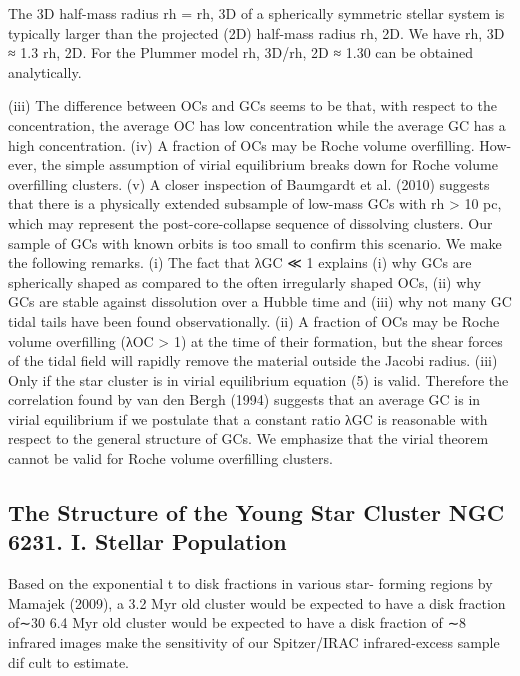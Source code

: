 \documentclass[../main.tex]{subfiles}
\begin{document}
The 3D half-mass radius rh = rh, 3D of a spherically symmetric
stellar system is typically larger than the projected (2D) half-mass
radius rh, 2D. We have rh, 3D ≈ 1.3 rh, 2D. For the Plummer model
rh, 3D/rh, 2D ≈ 1.30 can be obtained analytically.

(iii) The difference between OCs and GCs seems to be that, with
respect to the concentration, the average OC has low concentration
while the average GC has a high concentration.
(iv) A fraction of OCs may be Roche volume overfilling. How-
ever, the simple assumption of virial equilibrium breaks down for
Roche volume overfilling clusters.
(v) A closer inspection of Baumgardt et al. (2010) suggests that
there is a physically extended subsample of low-mass GCs with
rh > 10 pc, which may represent the post-core-collapse sequence
of dissolving clusters. Our sample of GCs with known orbits is too
small to confirm this scenario.
We make the following remarks.
(i) The fact that λGC ≪ 1 explains (i) why GCs are spherically
shaped as compared to the often irregularly shaped OCs, (ii) why
GCs are stable against dissolution over a Hubble time and (iii) why
not many GC tidal tails have been found observationally.
(ii) A fraction of OCs may be Roche volume overfilling (λOC >
1) at the time of their formation, but the shear forces of the tidal
field will rapidly remove the material outside the Jacobi radius.
(iii) Only if the star cluster is in virial equilibrium equation (5)
is valid. Therefore the correlation found by van den Bergh (1994)
suggests that an average GC is in virial equilibrium if we postulate
that a constant ratio λGC is reasonable with respect to the general
structure of GCs. We emphasize that the virial theorem cannot be
valid for Roche volume overfilling clusters.

\subsection{The Structure of the Young Star Cluster NGC 6231. I. Stellar Population}


Based on the exponential t to disk fractions in various star-
forming regions by Mamajek (2009), a 3.2 Myr old cluster
would be expected to have a disk fraction of∼30%
6.4 Myr old cluster would be expected to have a disk fraction of
∼8%
infraredimages makethe sensitivity of our Spitzer/IRAC
infrared-excess sample dif cult to estimate.
\end{document}

